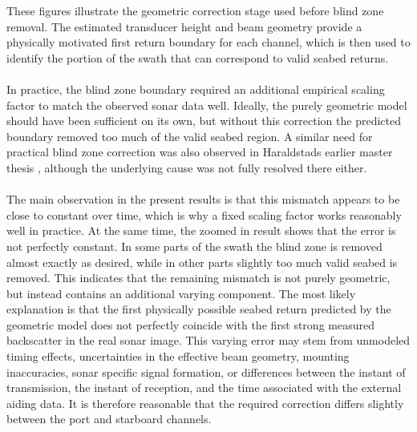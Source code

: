 \noindent
These figures illustrate the geometric correction stage used before blind zone removal. The estimated transducer height and beam geometry provide a physically motivated first return boundary for each channel, which is then used to identify the portion of the swath that can correspond to valid seabed returns.
\\ \\
In practice, the blind zone boundary required an additional empirical scaling factor to match the observed sonar data well. Ideally, the purely geometric model should have been sufficient on its own, but without this correction the predicted boundary removed too much of the valid seabed region. A similar need for practical blind zone correction was also observed in Haraldstads earlier master thesis \cite{side_scan_sonar_master_thesis}, although the underlying cause was not fully resolved there either.  
\\ \\
The main observation in the present results is that this mismatch appears to be close to constant over time, which is why a fixed scaling factor works reasonably well in practice. At the same time, the zoomed in result shows that the error is not perfectly constant. In some parts of the swath the blind zone is removed almost exactly as desired, while in other parts slightly too much valid seabed is removed. This indicates that the remaining mismatch is not purely geometric, but instead contains an additional varying component. The most likely explanation is that the first physically possible seabed return predicted by the geometric model does not perfectly coincide with the first strong measured backscatter in the real sonar image. This varying error may stem from unmodeled timing effects, uncertainties in the effective beam geometry, mounting inaccuracies, sonar specific signal formation, or differences between the instant of transmission, the instant of reception, and the time associated with the external aiding data. It is therefore reasonable that the required correction differs slightly between the port and starboard channels.

\newpage


